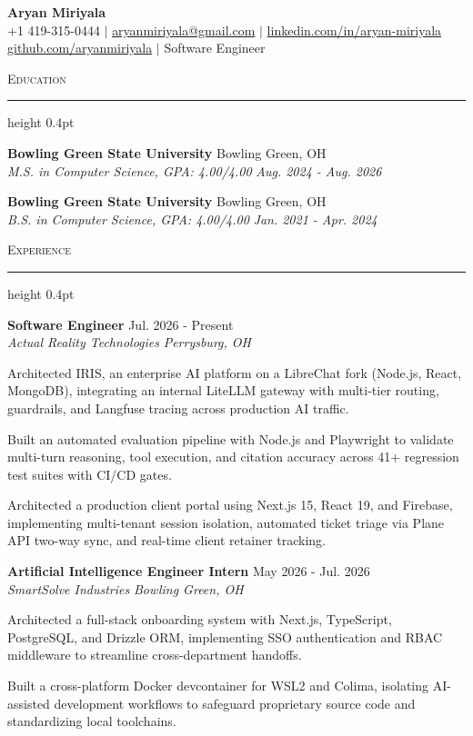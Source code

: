 \documentclass[letterpaper,11pt]{article}
\newcommand{\resumesection}[1]{%
  \par\vspace{2pt}%
  {\large\scshape #1}\par\vspace{2pt}%
  \hrule height 0.4pt\vspace{2pt}%
}
\newcommand{\resumeSubheading}[4]{
  \textbf{#1} \hfill #2\\
  \textit{#3} \hfill \textit{#4}
}
\begin{document}
\begin{center}
  {\LARGE \textbf{Aryan Miriyala}}\\[2pt]
  \small
  +1 419-315-0444 $|$ \href{mailto:aryanmiriyala@gmail.com}{aryanmiriyala@gmail.com} $|$ \href{https://www.linkedin.com/in/aryan-miriyala-7788a21b6/}{linkedin.com/in/aryan-miriyala}\\
  \href{https://github.com/aryanmiriyala}{github.com/aryanmiriyala} $|$ Software Engineer
\end{center}\vspace{-6pt}

\resumesection{Education}
\resumeSubheading
{Bowling Green State University}{Bowling Green, OH}
{M.S. in Computer Science, GPA: 4.00/4.00}{Aug. 2024 - Aug. 2026}

\resumeSubheading
{Bowling Green State University}{Bowling Green, OH}
{B.S. in Computer Science, GPA: 4.00/4.00}{Jan. 2021 - Apr. 2024}

\resumesection{Experience}
\resumeSubheading
{Software Engineer}{Jul. 2026 - Present}
{Actual Reality Technologies}{Perrysburg, OH}
\begin{tightitemize}
  \item Architected IRIS, an enterprise AI platform on a LibreChat fork (Node.js, React, MongoDB), integrating an internal LiteLLM gateway with multi-tier routing, guardrails, and Langfuse tracing across production AI traffic.
  \item Built an automated evaluation pipeline with Node.js and Playwright to validate multi-turn reasoning, tool execution, and citation accuracy across 41+ regression test suites with CI/CD gates.
  \item Architected a production client portal using Next.js 15, React 19, and Firebase, implementing multi-tenant session isolation, automated ticket triage via Plane API two-way sync, and real-time client retainer tracking.
\end{tightitemize}

\resumeSubheading
{Artificial Intelligence Engineer Intern}{May 2026 - Jul. 2026}
{SmartSolve Industries}{Bowling Green, OH}
\begin{tightitemize}
  \item Architected a full-stack onboarding system with Next.js, TypeScript, PostgreSQL, and Drizzle ORM, implementing SSO authentication and RBAC middleware to streamline cross-department handoffs.
  \item Built a cross-platform Docker devcontainer for WSL2 and Colima, isolating AI-assisted development workflows to safeguard proprietary source code and standardizing local toolchains.
\end{tightitemize}
\end{document}
